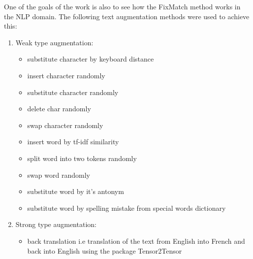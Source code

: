 \documentclass[12pt]{article}
\theoremstyle{definition}
\DeclareRobustCommand{\[}{\begin{equation}}
\DeclareRobustCommand{\]}{\end{equation}}
\begin{document}
\setlength{\parindent}{4ex}One of the goals of the work is also to see how the FixMatch method works in the NLP domain.
The following text augmentation methods were used to achieve this:
\begin{enumerate}
    \item Weak type augmentation:
        \begin{itemize}
            \item substitute character by keyboard distance
            \item insert character randomly
            \item substitute character randomly
            \item delete char randomly
            \item swap character randomly
            \item insert word by tf-idf similarity
            \item split word into two tokens randomly
            \item swap word randomly
            \item substitute word by it's antonym
            \item substitute word by spelling mistake from special words dictionary
        \end{itemize}
    \item Strong type augmentation: 
        \begin{itemize}
            \item back translation i.e translation of the text from English into French and back into English using the package Tensor2Tensor \cite{tensor2tensor}
        \end{itemize}
\end{enumerate}
\end{document}
